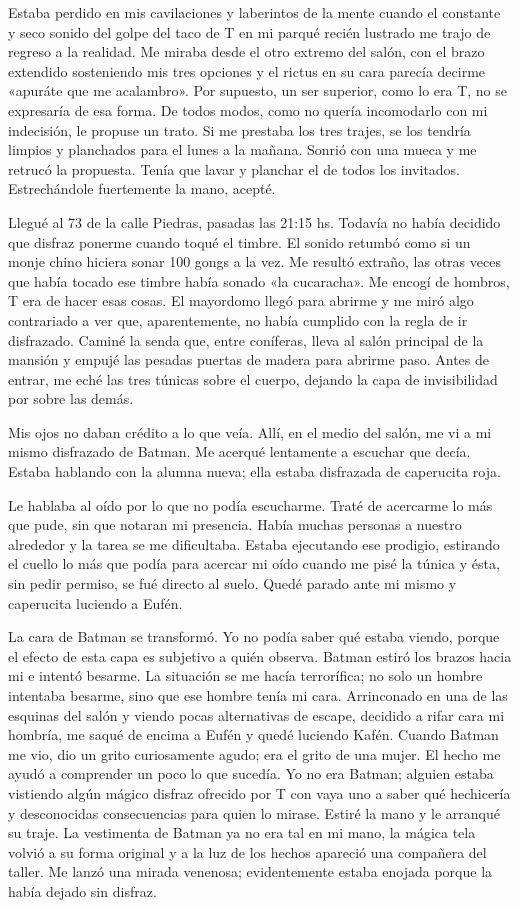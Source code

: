\documentclass[11pt,twoside,openright,a5paper]{book}
\begin{document}
Estaba perdido en mis cavilaciones y laberintos de la mente cuando el constante y seco sonido del golpe del taco de T en mi parqué recién lustrado me trajo de regreso a la realidad. Me miraba desde el otro extremo del salón, con el brazo extendido sosteniendo mis tres opciones y el rictus en su cara parecía decirme «apuráte que me acalambro». Por supuesto, un ser superior, como lo era T, no se expresaría de esa forma. De todos modos, como no quería incomodarlo con mi indecisión, le propuse un trato. Si me prestaba los tres trajes, se los tendría limpios y planchados para el lunes a la mañana. Sonrió con una mueca y me retrucó la propuesta. Tenía que lavar y planchar el de todos los invitados. Estrechándole fuertemente la mano, acepté.

Llegué al 73 de la calle Piedras, pasadas las 21:15 hs. Todavía no había decidido que disfraz ponerme cuando toqué el timbre. El sonido retumbó como si un monje chino hiciera sonar 100 gongs a la vez. Me resultó extraño, las otras veces que había tocado ese timbre había sonado «la cucaracha». Me encogí de hombros, T era de hacer esas cosas. El mayordomo llegó para abrirme y me miró algo contrariado a ver que, aparentemente, no había cumplido con la regla de ir disfrazado. Caminé la senda que, entre coníferas, lleva al salón principal de la mansión y empujé las pesadas puertas de madera para abrirme paso. Antes de entrar, me eché las tres túnicas sobre el cuerpo, dejando la capa de invisibilidad por sobre las demás. 

Mis ojos no daban crédito a lo que veía. Allí, en el medio del salón, me vi a mi mismo disfrazado de Batman. Me acerqué lentamente a escuchar que decía. Estaba hablando con la alumna nueva; ella estaba disfrazada de caperucita roja.

Le hablaba al oído por lo que no podía escucharme. Traté de acercarme lo más que pude, sin que notaran mi presencia. Había muchas personas a nuestro alrededor y la tarea se me dificultaba. Estaba ejecutando ese prodigio, estirando el cuello lo más que podía para acercar mi oído cuando me pisé la túnica y ésta, sin pedir permiso, se fué directo al suelo. Quedé parado ante mi mismo y caperucita luciendo a Eufén.

La cara de Batman se transformó. Yo no podía saber qué estaba viendo, porque el efecto de esta capa es subjetivo a quién observa. Batman estiró los brazos hacia mi e intentó besarme. La situación se me hacía terrorífica; no solo un hombre intentaba besarme, sino que ese hombre tenía mi cara. Arrinconado en una de las esquinas del salón y viendo pocas alternativas de escape, decidido a rifar cara mi hombría, me saqué de encima a Eufén y quedé luciendo Kafén. Cuando Batman me vio, dio un grito curiosamente agudo; era el grito de una mujer. El hecho me ayudó a comprender un poco lo que sucedía. Yo no era Batman; alguien estaba vistiendo algún mágico disfraz ofrecido por T con vaya uno a saber qué hechicería y desconocidas consecuencias para quien lo mirase. Estiré la mano y le arranqué su traje. La vestimenta de Batman ya no era tal en mi mano, la mágica tela volvió a su forma original y a la luz de los hechos apareció una compañera del taller. Me lanzó una mirada venenosa; evidentemente estaba enojada porque la había dejado sin disfraz.
\end{document}
